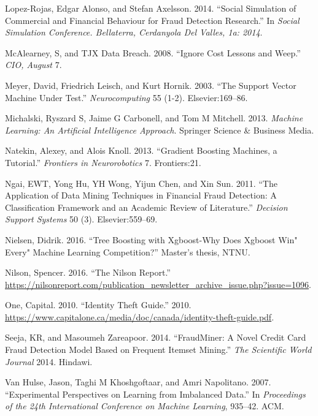 \documentclass[12pt,]{article}
\begin{document}
\leavevmode\hypertarget{ref-lopez2014social}{}%
Lopez-Rojas, Edgar Alonso, and Stefan Axelsson. 2014. ``Social
Simulation of Commercial and Financial Behaviour for Fraud Detection
Research.'' In \emph{Social Simulation Conference. Bellaterra,
Cerdanyola Del Valles, 1a: 2014}.

\leavevmode\hypertarget{ref-mcalearney2008ignore}{}%
McAlearney, S, and TJX Data Breach. 2008. ``Ignore Cost Lessons and
Weep.'' \emph{CIO, August} 7.

\leavevmode\hypertarget{ref-meyer2003support}{}%
Meyer, David, Friedrich Leisch, and Kurt Hornik. 2003. ``The Support
Vector Machine Under Test.'' \emph{Neurocomputing} 55 (1-2).
Elsevier:169--86.

\leavevmode\hypertarget{ref-michalski2013machine}{}%
Michalski, Ryszard S, Jaime G Carbonell, and Tom M Mitchell. 2013.
\emph{Machine Learning: An Artificial Intelligence Approach}. Springer
Science \& Business Media.

\leavevmode\hypertarget{ref-natekin2013gradient}{}%
Natekin, Alexey, and Alois Knoll. 2013. ``Gradient Boosting Machines, a
Tutorial.'' \emph{Frontiers in Neurorobotics} 7. Frontiers:21.

\leavevmode\hypertarget{ref-ngai2011application}{}%
Ngai, EWT, Yong Hu, YH Wong, Yijun Chen, and Xin Sun. 2011. ``The
Application of Data Mining Techniques in Financial Fraud Detection: A
Classification Framework and an Academic Review of Literature.''
\emph{Decision Support Systems} 50 (3). Elsevier:559--69.

\leavevmode\hypertarget{ref-nielsen2016tree}{}%
Nielsen, Didrik. 2016. ``Tree Boosting with Xgboost-Why Does Xgboost
Win" Every" Machine Learning Competition?'' Master's thesis, NTNU.

\leavevmode\hypertarget{ref-nilson2016nilson}{}%
Nilson, Spencer. 2016. ``The Nilson Report.''
\url{https://nilsonreport.com/publication_newsletter_archive_issue.php?issue=1096}.

\leavevmode\hypertarget{ref-capitaloneguide}{}%
One, Capital. 2010. ``Identity Theft Guide.'' 2010.
\url{https://www.capitalone.ca/media/doc/canada/identity-theft-guide.pdf}.

\leavevmode\hypertarget{ref-seeja2014fraudminer}{}%
Seeja, KR, and Masoumeh Zareapoor. 2014. ``FraudMiner: A Novel Credit
Card Fraud Detection Model Based on Frequent Itemset Mining.'' \emph{The
Scientific World Journal} 2014. Hindawi.

\leavevmode\hypertarget{ref-van2007experimental}{}%
Van Hulse, Jason, Taghi M Khoshgoftaar, and Amri Napolitano. 2007.
``Experimental Perspectives on Learning from Imbalanced Data.'' In
\emph{Proceedings of the 24th International Conference on Machine
Learning}, 935--42. ACM.
\end{document}
